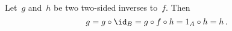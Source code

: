 \subsection{}

Let~$g$ and~$h$ be two two-sided inverses to~$f$.
Then
\[
	g
	=
	g \circ \id_B
	=
	g \circ f \circ h
	=
	1_A \circ h
	=
	h \,.
\]
